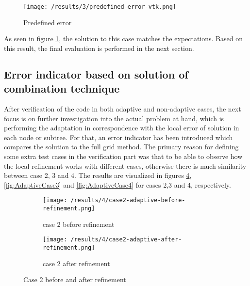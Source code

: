 		
\begin{figure}[h]
	\centering
	    \texttt{[image: /results/3/predefined-error-vtk.png]}
		\centering    
	 \caption{Predefined error}
       \label{fig:PredefError}
\end{figure}

As seen in figure \ref{fig:PredefError}, the solution to this case matches the expectations. Based on this result, the final evaluation is performed in the next section.

\subsection{Error indicator based on solution of combination technique}
After verification of the code in both adaptive and non-adaptive cases, the next focus is on further investigation into the actual problem at hand, which is performing the adaptation in correspondence with the local error of solution in each node or subtree. For that, an error indicator has been introduced which compares the solution to the full grid method. The primary reason for defining some extra test cases in the verification part was that to be able to observe how the local refinement works with different cases, otherwise there is much similarity between case 2, 3 and 4. The results are visualized in figures \ref{fig:AdaptiveCase2}, \ref{fig:AdaptiveCase3} and \ref{fig:AdaptiveCase4} for cases 2,3 and 4, respectively.\\


\begin{figure}[h]
	\centering
    \begin{subfigure}[b]{0.49\textwidth}
	    \texttt{[image: /results/4/case2-adaptive-before-refinement.png]}
		\centering
        \caption{case 2 before refinement}
        \label{fig:AdaptiveCase2Before}
    \end{subfigure} 
    \begin{subfigure}[b]{0.49\textwidth}    
	    \texttt{[image: /results/4/case2-adaptive-after-refinement.png]}
		\centering    
	 \caption{case 2 after refinement}
       \label{fig:AdaptiveCase2After}
    \end{subfigure} 
    \caption{Case 2 before and after refinement}
    \label{fig:AdaptiveCase2}
\end{figure}

